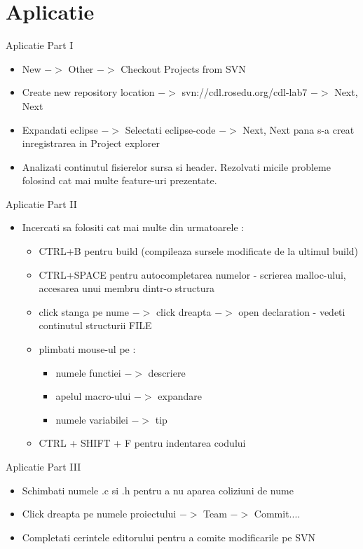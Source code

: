 \documentclass{beamer}
\begin{document}
\section{Aplicatie}
\frame{\tableofcontents[currentsection]}

\begin{frame}{Aplicatie Part I}
\begin{itemize}
  \item New $->$ Other $->$ Checkout Projects from SVN
  \item Create new repository location $->$ svn://cdl.rosedu.org/cdl-lab7 $->$ Next, Next
  \item Expandati eclipse $->$ Selectati eclipse-code $->$ Next, Next pana s-a creat inregistrarea in Project explorer
  \item Analizati continutul fisierelor sursa si header. Rezolvati micile probleme folosind cat mai multe feature-uri prezentate.
\end{itemize}
\end{frame}

\begin{frame}{Aplicatie Part II}
\begin{itemize}
  \item Incercati sa folositi cat mai multe din urmatoarele :
    \begin{itemize}
      \item CTRL+B pentru build (compileaza sursele modificate de la ultimul build)
      \item CTRL+SPACE pentru autocompletarea numelor - scrierea malloc-ului, accesarea unui membru dintr-o structura
      \item click stanga pe nume $->$ click dreapta $->$ open declaration - vedeti continutul structurii FILE
      \item plimbati mouse-ul pe :
        \begin{itemize}
	  \item numele functiei $->$ descriere
	  \item apelul macro-ului $->$ expandare
	  \item numele variabilei $->$ tip
	\end{itemize}
      \item CTRL + SHIFT + F pentru indentarea codului
    \end{itemize}
\end{itemize}
\end{frame}

\begin{frame}{Aplicatie Part III}
\begin{itemize}
  \item Schimbati numele .c si .h pentru a nu aparea coliziuni de nume
  \item Click dreapta pe numele proiectului $->$ Team $->$ Commit....
  \item Completati cerintele editorului pentru a comite modificarile pe SVN
\end{itemize}
\end{frame}
\end{document}
